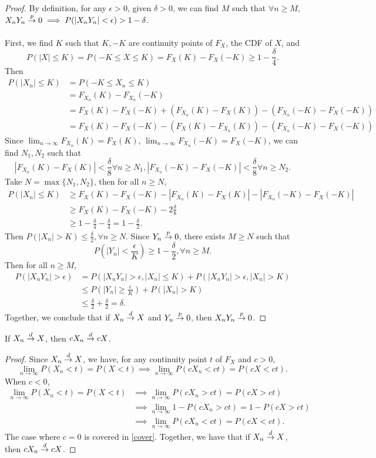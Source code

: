 \begin{proof}
By definition, for any $\epsilon>0$, given $\delta>0$, we can find $M$ such that $\forall n\geq M$, $X_nY_n\overset{p}{\rightarrow} 0 \implies P(|X_nY_n|<\epsilon)>1-\delta$.\\\\
First, we find $K$ such that $K,-K$ are continuity points of $F_X$, the CDF of $X$, and
\[
P(|X|\leq K) = P(-K\leq X\leq K) = F_X(K) - F_X(-K) \geq 1-\frac{\delta}{4}.
\]
Then
\begin{align*}
P(|X_n|\leq K) &= P(-K\leq X_n \leq K)\\
&= F_{X_n}(K) - F_{X_n}(-K)\\
&= F_X(K) - F_X(-K) + (F_{X_n}(K) - F_X(K)) - (F_{X_n}(-K)-F_{X}(-K))\\
&= F_X(K) - F_X(-K) - (F_{X}(K) - F_{X_n}(K)) - (F_{X_n}(-K) - F_{X}(-K))
\end{align*}
Since $\lim_{n\to\infty}F_{X_n}(K) = F_X(K)$, $\lim_{n\to\infty}F_{X_n}(-K) = F_X(-K)$, we can find $N_1, N_2$ such that
\[
|F_{X_n}(K)-F_X(K)|<\frac{\delta}{8} \forall n\geq N_1, |F_{X_n}(-K)-F_X(-K)|<\frac{\delta}{8} \forall n\geq N_2.
\]
Take $N=\max\{N_1,N_2\}$, then for all $n\geq N$,
\begin{align*}
P(|X_n|\leq K) &\geq F_X(K) - F_X(-K) - |F_{X_n}(K)-F_X(K)| - |F_{X_n}(-K)-F_X(-K)|\\
&\geq F_X(K) - F_X(-K) - 2\frac{\delta}{8}\\
&\geq 1-\frac{\delta}{4}-\frac{\delta}{4} = 1-\frac{\delta}{2}.
\end{align*}
Then $P(|X_n|>K)\leq \frac{\delta}{2}, \forall n\geq N$. Since $Y_n\overset{p}{\rightarrow} 0$, there exists $M\geq N$ such that
\[
P(|Y_n| < \frac{\epsilon}{K}) \geq 1-\frac{\delta}{2}, \forall n\geq M.
\]
Then for all $n\geq M$,
\begin{align*}
P(|X_nY_n|>\epsilon) &= P(|X_nY_n|>\epsilon, |X_n|\leq K) + P(|X_nY_n|>\epsilon, |X_n| > K)\\
&\leq P(|Y_n|\geq \frac{\epsilon}{K}) + P(|X_n|>K)\\
&\leq \frac{\delta}{2} + \frac{\delta}{2} = \delta.
\end{align*}
Together, we conclude that if $X_n \overset{d}{\rightarrow} X$ and $Y_n \overset{p}{\rightarrow} 0$, then $X_nY_n \overset{p}{\rightarrow} 0$.
\end{proof}
\begin{lemma}
If $X_n \overset{d}{\rightarrow} X$, then $cX_n \overset{d}{\rightarrow} cX$.
\end{lemma}
\begin{proof}
Since $X_n\overset{d}{\rightarrow} X$, we have, for any continuity point $t$ of $F_{X}$ and $c>0$,
\[
\lim_{n\to\infty}P(X_n<t) = P(X<t) \implies \lim_{n\to\infty}P(cX_n<ct) = P(cX<ct).
\]
When $c<0$,
\begin{align*}
\lim_{n\to\infty}P(X_n<t) = P(X<t) &\implies \lim_{n\to\infty}P(cX_n>ct) = P(cX>ct)\\
&\implies \lim_{n\to\infty}1-P(cX_n>ct) = 1-P(cX>ct)\\
&\implies \lim_{n\to\infty}P(cX_n<ct) = P(cX<ct).
\end{align*}
The case where $c=0$ is covered in \cref{cover}. Together, we have that if $X_n \overset{d}{\rightarrow} X$, then $cX_n \overset{d}{\rightarrow} cX$.
\end{proof}
